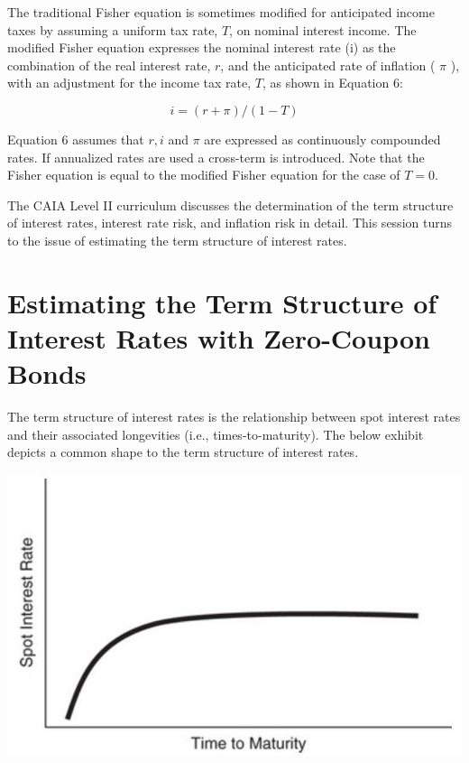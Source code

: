 \documentclass[11pt]{article}
\begin{document}
The traditional Fisher equation is sometimes modified for anticipated income taxes by assuming a uniform tax rate, $T$, on nominal interest income. The modified Fisher equation expresses the nominal interest rate (i) as the combination of the real interest rate, $r$, and the anticipated rate of inflation ( $\pi$ ), with an adjustment for the income tax rate, $T$, as shown in Equation 6:


\begin{equation*}
i=(r+\pi) /(1-T) \tag{6}
\end{equation*}


Equation 6 assumes that $r, i$ and $\pi$ are expressed as continuously compounded rates. If annualized rates are used a cross-term is introduced. Note that the Fisher equation is equal to the modified Fisher equation for the case of $T=0$.

The CAIA Level II curriculum discusses the determination of the term structure of interest rates, interest rate risk, and inflation risk in detail. This session turns to the issue of estimating the term structure of interest rates.

\section*{Estimating the Term Structure of Interest Rates with Zero-Coupon Bonds}
The term structure of interest rates is the relationship between spot interest rates and their associated longevities (i.e., times-to-maturity). The below exhibit depicts a common shape to the term structure of interest rates.

\begin{center}
\includegraphics[max width=\textwidth]{2024_04_10_58b17af8323992df0cbag-3}
\end{center}
\end{document}
